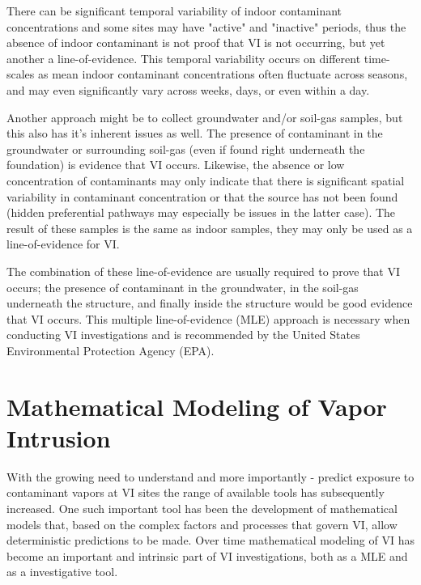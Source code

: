 \documentclass[../thesis.tex]{subfiles}
\begin{document}
There can be significant temporal variability of indoor contaminant concentrations and some sites may have "active" and "inactive" periods, thus the absence of indoor contaminant is not proof that VI is not occurring, but yet another a line-of-evidence.
This temporal variability occurs on different time-scales as mean indoor contaminant concentrations often fluctuate across seasons, and may even significantly vary across weeks, days, or even within a day.

Another approach might be to collect groundwater and/or soil-gas samples, but this also has it's inherent issues as well.
The presence of contaminant in the groundwater or surrounding soil-gas (even if found right underneath the foundation) is evidence that VI occurs.
Likewise, the absence or low concentration of contaminants may only indicate that there is significant spatial variability in contaminant concentration or that the source has not been found (hidden preferential pathways may especially be issues in the latter case).
The result of these samples is the same as indoor samples, they may only be used as a line-of-evidence for VI.

The combination of these line-of-evidence are usually required to prove that VI occurs; the presence of contaminant in the groundwater, in the soil-gas underneath the structure, and finally inside the structure would be good evidence that VI occurs.
This multiple line-of-evidence (MLE) approach is necessary when conducting VI investigations and is recommended by the United States Environmental Protection Agency (EPA).

\section{Mathematical Modeling of Vapor Intrusion}

With the growing need to understand and more importantly - predict exposure to contaminant vapors at VI sites the range of available tools has subsequently increased.
One such important tool has been the development of mathematical models that, based on the complex factors and processes that govern VI, allow deterministic predictions to be made.
Over time mathematical modeling of VI has become an important and intrinsic part of VI investigations, both as a MLE and as a investigative tool.\par
\end{document}
